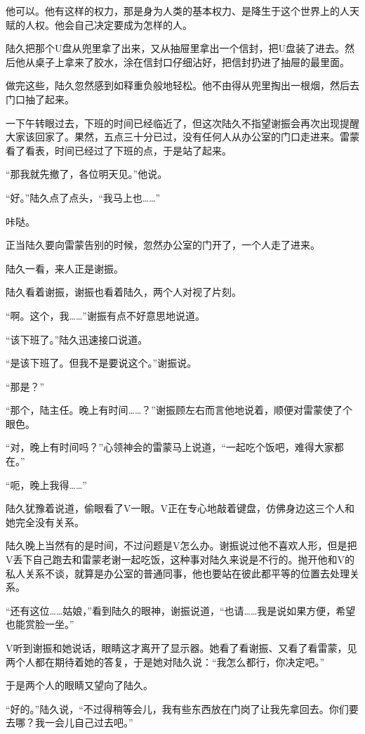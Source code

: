 他可以。他有这样的权力，那是身为人类的基本权力、是降生于这个世界上的人天赋的人权。他会自己决定要成为怎样的人。

陆久把那个U盘从兜里拿了出来，又从抽屉里拿出一个信封，把U盘装了进去。然后他从桌子上拿来了胶水，涂在信封口仔细沾好，把信封扔进了抽屉的最里面。

做完这些，陆久忽然感到如释重负般地轻松。他不由得从兜里掏出一根烟，然后去门口抽了起来。

一下午转眼过去，下班的时间已经临近了，但这次陆久不指望谢振会再次出现提醒大家该回家了。果然，五点三十分已过，没有任何人从办公室的门口走进来。雷蒙看了看表，时间已经过了下班的点，于是站了起来。

“那我就先撤了，各位明天见。”他说。

“好。”陆久点了点头，“我马上也……”

咔哒。

正当陆久要向雷蒙告别的时候，忽然办公室的门开了，一个人走了进来。

陆久一看，来人正是谢振。

陆久看着谢振，谢振也看着陆久，两个人对视了片刻。

“啊。这个，我……”谢振有点不好意思地说道。

“该下班了。”陆久迅速接口说道。

“是该下班了。但我不是要说这个。”谢振说。

“那是？”

“那个，陆主任。晚上有时间……？”谢振顾左右而言他地说着，顺便对雷蒙使了个眼色。

“对，晚上有时间吗？”心领神会的雷蒙马上说道，“一起吃个饭吧，难得大家都在。”

“呃，晚上我得……”

陆久犹豫着说道，偷眼看了V一眼。V正在专心地敲着键盘，仿佛身边这三个人和她完全没有关系。

陆久晚上当然有的是时间，不过问题是V怎么办。谢振说过他不喜欢人形，但是把V丢下自己跑去和雷蒙老谢一起吃饭，这种事对陆久来说是不行的。抛开他和V的私人关系不谈，就算是办公室的普通同事，他也要站在彼此都平等的位置去处理关系。

“还有这位……姑娘，”看到陆久的眼神，谢振说道，“也请……我是说如果方便，希望也能赏脸一坐。”

V听到谢振和她说话，眼睛这才离开了显示器。她看了看谢振、又看了看雷蒙，见两个人都在期待着她的答复，于是她对陆久说：“我怎么都行，你决定吧。”

于是两个人的眼睛又望向了陆久。

“好的。”陆久说，“不过得稍等会儿，我有些东西放在门岗了让我先拿回去。你们要去哪？我一会儿自己过去吧。”

